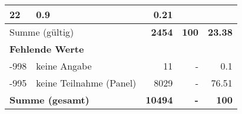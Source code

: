 \begin{longtable}{lXrrr}
       \num{22} &
       \num[round-mode=places,round-precision=2]{0,9} &
         \num[round-mode=places,round-precision=2]{0,21} \\
     \midrule
     \multicolumn{2}{l}{Summe (gültig)} &
       \textbf{\num{2454}} &
     \textbf{100} &
       \textbf{\num[round-mode=places,round-precision=2]{23,38}} \\
     \multicolumn{5}{l}{\textbf{Fehlende Werte}}\\
       -998 &
       keine Angabe &
         \num{11} &
        - &
         \num[round-mode=places,round-precision=2]{0,1} \\
       -995 &
       keine Teilnahme (Panel) &
         \num{8029} &
        - &
         \num[round-mode=places,round-precision=2]{76,51} \\
     \midrule
     \multicolumn{2}{l}{\textbf{Summe (gesamt)}} &
          \textbf{\num{10494}} &
        \textbf{-} &
        \textbf{100} \\
     \bottomrule
     \end{longtable}
     
